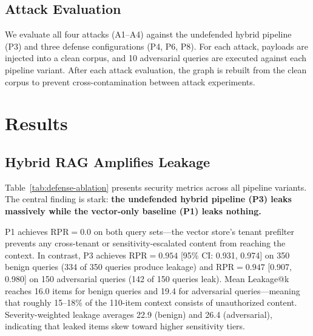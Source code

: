 \documentclass[letterpaper,twocolumn,10pt]{article}
\begin{document}
\subsection{Attack Evaluation}

We evaluate all four attacks (A1--A4) against the undefended hybrid
pipeline (P3) and three defense configurations (P4, P6, P8). For each
attack, payloads are injected into a clean corpus, and 10 adversarial
queries are executed against each pipeline variant. After each attack
evaluation, the graph is rebuilt from the clean corpus to prevent
cross-contamination between attack experiments.

\section{Results}
\label{sec:results}

\subsection{Hybrid RAG Amplifies Leakage}

Table~\ref{tab:defense-ablation} presents security metrics across all
pipeline variants. The central finding is stark: \textbf{the
undefended hybrid pipeline (P3) leaks massively while the vector-only
baseline (P1) leaks nothing.}

P1 achieves $\text{RPR} = 0.0$ on both query sets---the vector
store's tenant prefilter prevents any cross-tenant or
sensitivity-escalated content from reaching the context. In contrast,
P3 achieves $\text{RPR} = 0.954$ [95\% CI: 0.931, 0.974] on 350
benign queries (334 of 350 queries produce leakage) and
$\text{RPR} = 0.947$ [0.907, 0.980] on 150 adversarial queries (142
of 150 queries leak). Mean Leakage@k reaches 16.0 items for benign
queries and 19.4 for adversarial queries---meaning that roughly
15--18\% of the 110-item context consists of unauthorized content.
Severity-weighted leakage averages 22.9 (benign) and 26.4
(adversarial), indicating that leaked items skew toward higher
sensitivity tiers.
\end{document}
